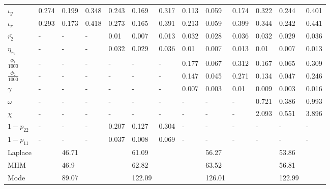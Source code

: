 \documentclass[12pt]{article}
\numberwithin{equation}{section}
\begin{document}
\begin{table}
{\begin{tabular}{l|lll|lll||lll|lll}
$\iota_y$ & 0.274 & 0.199 & 0.348 & 0.243 & 0.169 & 0.317 & 0.113 & 0.059 & 0.174 & 0.322 & 0.244 & 0.401 \\
$\iota_{\pi}$ & 0.293 & 0.173 & 0.418 & 0.273 & 0.165 & 0.391 & 0.213 & 0.059 & 0.399 & 0.344 & 0.242 & 0.441 \\
$\bar{r_2}$ & - & - & - & 0.01 & 0.007 & 0.013 & 0.032 & 0.028 & 0.036 & 0.032 & 0.029 & 0.036 \\
$\eta_{r_2}$ &- & -  & - & 0.032 & 0.029 & 0.036 & 0.01 & 0.007 & 0.013 & 0.01 & 0.007 & 0.013 \\
$\frac{\Phi_1}{1000}$ & - & - & - & - & - & - & 0.177 & 0.067 & 0.312 & 0.167 & 0.065 & 0.309 \\
$\frac{\Phi_2}{1000}$ & - & - & - & - & - & - & 0.147 & 0.045 & 0.271 & 0.134 & 0.047 & 0.246 \\
$\gamma$ & -  & - & - & - & - & - & 0.007 & 0.003 & 0.01 & 0.009 & 0.003 & 0.016 \\
$\omega$ & - & - & - & - & - & - & - & - & - & 0.721 & 0.386 & 0.993 \\
$\chi$ & - & - & - & - & - & - & - & - & - & 2.093 & 0.551 & 3.896 \\
$1-p_{22}$ & - & - & - & 0.207 & 0.127 & 0.304 & - & - & - & - &-  & - \\
$1-p_{11}$ & - & - & - & 0.037 & 0.008 & 0.069 & - & - & - & - & - & - \\
\hline
\hline
 Laplace &  & 46.71 &  &   & 61.09 &  &   & 56.27 &  &  & 53.86 &  \\
 MHM & & 46.9 &  &   & 62.82 &  &  & 63.52 &  &   & 56.81 &  \\
Mode &  & 89.07 &  &   & 122.09 &  &   & 126.01 &  &   & 122.99 & 
\end{tabular}}
\end{table}
\end{document}
